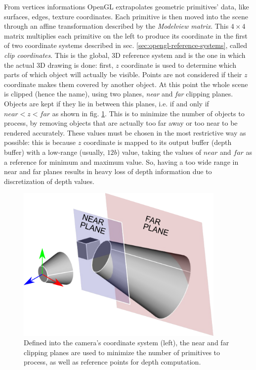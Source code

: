 From vertices informations OpenGL extrapolates geometric primitives'
data, like surfaces, edges, texture coordinates.
Each primitive is then moved into the scene through an affine transformation
described by the \emph{Modelview matrix}. This $4 \times 4$ matrix multiplies
each primitive on the left to produce its coordinate in the first of two
coordinate systems described in sec. \ref{sec:opengl-reference-systems}, called
\emph{clip coordinates}. This is the global, 3D reference system and is the one in
which the actual 3D drawing is done: first, $z$ coordinate is used to determine
which parts of which object will actually be visible. Points are not considered
if their $z$ coordinate makes them covered by another object. At this point the
whole scene is clipped (hence the name), using two planes, \emph{near} and
\emph{far} clipping planes. Objects are kept if they lie in between this planes,
i.e. if and only if $near<z<far$ as shown in fig. \ref{fig:clipping-planes}.
This is to minimize the number of objects to process, by removing objects that
are actually too far away or too near to be rendered accurately. These values
must be chosen in the most restrictive way as possible: this is because $z$
coordinate is mapped to its output buffer (depth buffer) with a low-range
(usually, $12\unit{b}$) value, taking the values of $near$ and $far$ as a
reference for minimum and maximum value. So, having a too wide range in near and
far planes results in heavy loss of depth information due to discretization of
depth values.

\begin{figure}[htbp]
  \centering
  \includegraphics[width=4in]{./Graphics/clipping_planes}
  \caption{Defined into the camera's coordinate system (left), the near and far clipping planes are used to minimize the number of
  primitives to process, as well as reference points for depth computation. \label{fig:clipping-planes}}
\end{figure}


